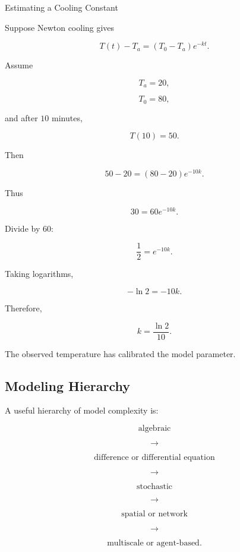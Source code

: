 \begin{workedexamplebox}{Estimating a Cooling Constant}

Suppose Newton cooling gives

\[
T(t)-T_a
=
(T_0-T_a)e^{-kt}.
\]

Assume

\[
T_a=20,
\]

\[
T_0=80,
\]

and after \(10\) minutes,

\[
T(10)=50.
\]

Then

\[
50-20
=
(80-20)e^{-10k}.
\]

Thus

\[
30
=
60e^{-10k}.
\]

Divide by \(60\):

\[
\frac12
=
e^{-10k}.
\]

Taking logarithms,

\[
-\ln2
=
-10k.
\]

Therefore,

\begin{answerbox}
\[
\boxed{
k
=
\frac{\ln2}{10}.
}
\]
\end{answerbox}

The observed temperature has calibrated the model parameter.

\end{workedexamplebox}

\subsection{Modeling Hierarchy}
\label{subsec:modeling-hierarchy}

A useful hierarchy of model complexity is:

\[
\boxed{
\text{algebraic}
}
\]

\[
\longrightarrow
\]

\[
\boxed{
\text{difference or differential equation}
}
\]

\[
\longrightarrow
\]

\[
\boxed{
\text{stochastic}
}
\]

\[
\longrightarrow
\]

\[
\boxed{
\text{spatial or network}
}
\]

\[
\longrightarrow
\]

\[
\boxed{
\text{multiscale or agent-based}.
}
\]

